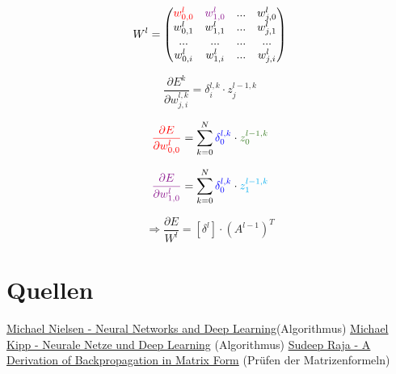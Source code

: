 \documentclass{article}
\begin{document}
\[ W^l = \begin{pmatrix}
    \textcolor{red}{w_{0,0}^l} & \textcolor{Plum}{w_{1,0}^l} & ... & w_{j,0}^l \\
    w_{0,1}^l & w_{1,1}^l & ... & w_{j,1}^l \\
    ... & ... & ... & ... \\
    w_{0,i}^l & w_{1,i}^l & ... & w_{j,i}^l
\end{pmatrix} \]



 \[ \frac{\partial E^k}{\partial w_{j,i}^{l,k}} = \delta_i^{l,k} \cdot z_j^{l-1,k} \]

 \[ \textcolor{red}{\frac{\partial E}{\partial w_{0,0}^l}} = 
 \sum_{k = 0}^{N} \textcolor{blue}{\delta_0^{l,k}} \cdot \textcolor{OliveGreen}{z_0^{l-1,k}} \]

  \[ \textcolor{Plum}{\frac{\partial E}{\partial w_{1,0}^l}} = 
 \sum_{k = 0}^{N} \textcolor{blue}{\delta_0^{l,k}} \cdot \textcolor{Cyan}{z_1^{l-1,k}} \]

\[ \Rightarrow \frac{\partial E}{W^l} = [\delta^l] \cdot (A^{l-1})^T \]


\section{Quellen}
\href{http://neuralnetworksanddeeplearning.com}{Michael Nielsen - Neural Networks and Deep Learning}(Algorithmus) \linebreak
\href{https://michaelkipp.de/deeplearning}{Michael Kipp - Neurale Netze und Deep Learning} (Algorithmus) \linebreak
\href{https://sudeepraja.github.io/Neural/}{Sudeep Raja - A Derivation of Backpropagation in Matrix Form} (Prüfen der Matrizenformeln)
\end{document}

